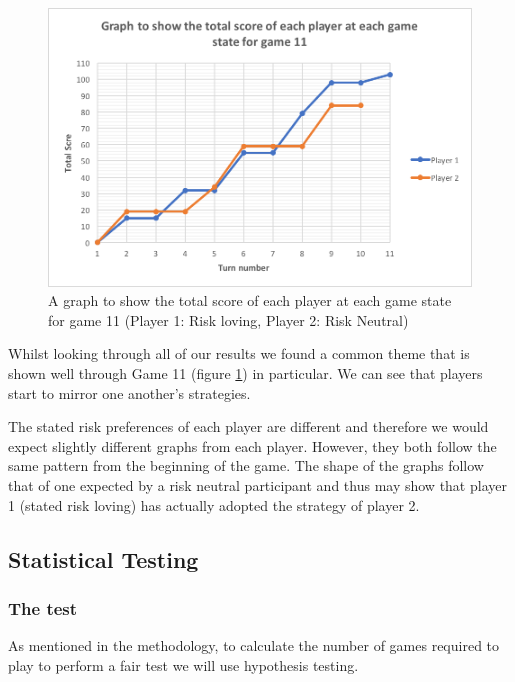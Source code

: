 \documentclass[a4paper,titlepage]{article}
\begin{document}
\begin{figure}
\includegraphics[scale=1]{game11}
\caption{A graph to show the total score of each player at each game state for game 11 (Player 1: Risk loving, Player 2: Risk Neutral)\label{figure14}}
\end{figure}
Whilst looking through all of our results we found a common theme that is shown well through Game 11 (figure \ref{figure14}) in particular. We can see that players start to mirror one another’s strategies.

The stated risk preferences of each player are different and therefore we would expect slightly different graphs from each player. However, they both follow the same pattern from the beginning of the game. The shape of the graphs follow that of one expected by a risk neutral participant and thus may show that player 1 (stated risk loving) has actually adopted the strategy of player 2.
\subsection{Statistical Testing}
\subsubsection{The test}
As mentioned in the methodology, to calculate the number of games required to play to perform a fair test we will use hypothesis testing.
\end{document}

